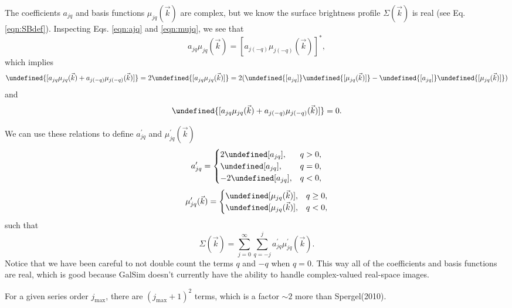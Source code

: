 \documentclass{article}
\let\Re\undefined
\DeclareMathOperator{\Re}{Re}
\let\Im\undefined
\DeclareMathOperator{\Im}{Im}
\begin{document}
The coefficients $a_{jq}$ and basis functions $\mu_{jq}(\vec{k})$ are complex, but we know the surface brightness profile $\Sigma(\vec{k})$ is real (see Eq. \ref{eqn:SBdef}).
Inspecting Eqs. \ref{eqn:ajq} and \ref{eqn:mujq}, we see that
\begin{equation}
  a_{jq}\mu_{jq}(\vec{k}) = [a_{j(-q)}\mu_{j(-q)}(\vec{k})]^*,
\end{equation}
which implies
\begin{equation}
  \Re{[a_{jq}\mu_{jq}(\vec{k}) + a_{j(-q)}\mu_{j(-q)}(\vec{k})]} = 2\Re{[a_{jq}\mu_{jq}(\vec{k})]}
  = 2 (\Re{[a_{jq}]}\Re{[\mu_{jq}(\vec{k})]} - \Im{[a_{jq}]}\Im{[\mu_{jq}(\vec{k})]})
\end{equation}
and
\begin{equation}
  \Im{[a_{jq}\mu_{jq}(\vec{k}) + a_{j(-q)}\mu_{j(-q)}(\vec{k})]} = 0.
\end{equation}

We can use these relations to define $a^\prime_{jq}$ and $\mu^\prime_{jq}(\vec{k})$
\[
a^\prime_{jq} =
\begin{cases}
  2 \Re[a_{jq}], & q > 0, \\
  \Re[a_{jq}], & q = 0, \\
  -2 \Im[a_{jq}], & q < 0,
\end{cases}
\]
\[
\mu^\prime_{jq}(\vec{k}) =
\begin{cases}
  \Re[\mu_{jq}(\vec{k})], & q \ge 0, \\
  \Im[\mu_{jq}(\vec{k})], & q < 0,
\end{cases}
\]
such that
\begin{equation}
  \label{eqn:sum_jqprime}
  \Sigma(\vec{k}) = \sum_{j=0}^{\infty}\sum_{q=-j}^{j} a^\prime_{jq}\mu^\prime_{jq}(\vec{k}).
\end{equation}
Notice that we have been careful to not double count the terms $q$ and $-q$ when $q=0$.
This way all of the coefficients and basis functions are real, which is good because GalSim doesn't currently have the ability to handle complex-valued real-space images.

For a given series order $j_\mathrm{max}$, there are $(j_\mathrm{max}+1)^2$ terms, which is a factor $\sim 2$ more than Spergel(2010).
\end{document}
